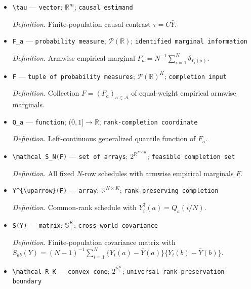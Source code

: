\documentclass{article}
\begin{document}
\begin{itemize}
  \par\smallskip\noindent\emph{Definition.} Armwise finite-population mean with coordinate \(\bar Y(a)=N^{-1}\sum_{i=1}^N Y_i(a)\).
  \item \texttt{\textbackslash{}\allowbreak{}tau} --- \texttt{vector}; \(\mathbb R^m\); \texttt{causal estimand}
  \par\smallskip\noindent\emph{Definition.} Finite-population causal contrast \(\tau=C\bar Y\).
  \item \texttt{F\_\allowbreak{}a} --- \texttt{probability measure}; \(\mathcal P(\mathbb R)\); \texttt{identified marginal information}
  \par\smallskip\noindent\emph{Definition.} Armwise empirical marginal \(F_a=N^{-1}\sum_{i=1}^N\delta_{Y_i(a)}\).
  \item \texttt{F} --- \texttt{tuple of probability measures}; \(\mathcal P(\mathbb R)^K\); \texttt{completion input}
  \par\smallskip\noindent\emph{Definition.} Collection \(F=(F_a)_{a\in\mathcal A}\) of equal-weight empirical armwise marginals.
  \item \texttt{Q\_\allowbreak{}a} --- \texttt{function}; \((0,1]\to\mathbb R\); \texttt{rank-\allowbreak{}completion coordinate}
  \par\smallskip\noindent\emph{Definition.} Left-continuous generalized quantile function of \(F_a\).
  \item \texttt{\textbackslash{}\allowbreak{}mathcal S\_\allowbreak{}N(F)} --- \texttt{set of arrays}; \(2^{\mathbb R^{N\times K}}\); \texttt{feasible completion set}
  \par\smallskip\noindent\emph{Definition.} All fixed \(N\)-row schedules with armwise empirical marginals \(F\).
  \item \texttt{Y\textasciicircum{}\{\textbackslash{}\allowbreak{}uparrow\}\allowbreak{}(F)} --- \texttt{array}; \(\mathbb R^{N\times K}\); \texttt{rank-\allowbreak{}preserving completion}
  \par\smallskip\noindent\emph{Definition.} Common-rank schedule with \(Y_i^{\uparrow}(a)=Q_a(i/N)\).
  \item \texttt{S(Y)} --- \texttt{matrix}; \(\mathbb S_+^K\); \texttt{cross-\allowbreak{}world covariance}
  \par\smallskip\noindent\emph{Definition.} Finite-population covariance matrix with \(S_{ab}(Y)=(N-1)^{-1}\sum_{i=1}^N\{Y_i(a)-\bar Y(a)\}\{Y_i(b)-\bar Y(b)\}\).
  \item \texttt{\textbackslash{}\allowbreak{}mathcal R\_\allowbreak{}K} --- \texttt{convex cone}; \(2^{\mathbb S_+^K}\); \texttt{universal rank-\allowbreak{}preservation boundary}

\end{itemize}
\end{document}
